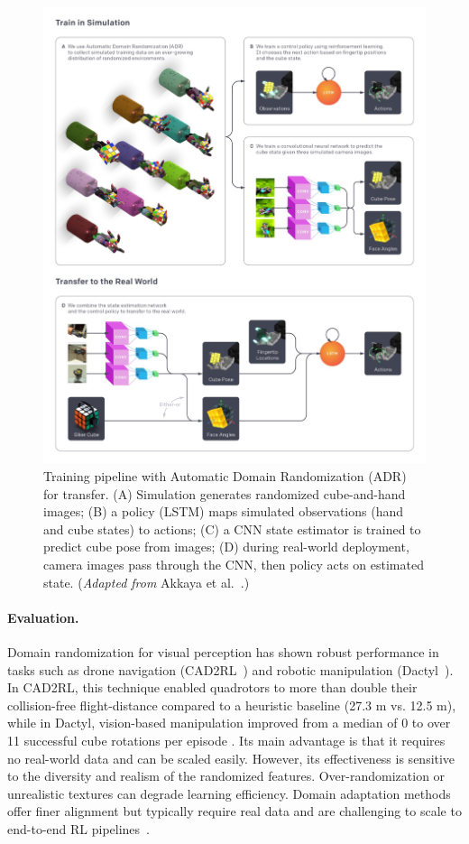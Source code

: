 \begin{figure}[H]
    \centering
    \includegraphics[width=0.95\linewidth]{figures/figAdrPipeline.png}
    \caption{Training pipeline with Automatic Domain Randomization (ADR) for \simtoreal transfer. (A) Simulation generates randomized cube-and-hand images; (B) a policy (LSTM) maps simulated observations (hand and cube states) to actions; (C) a CNN state estimator is trained to predict cube pose from images; (D) during real-world deployment, camera images pass through the CNN, then policy acts on estimated state. (\emph{Adapted from} Akkaya et al.~\cite{Akkaya2019}.)}
    \label{fig:adr_pipeline}
\end{figure}

\paragraph{Evaluation.} Domain randomization for visual perception has shown robust performance in tasks such as drone navigation (CAD2RL~\cite{Sadeghi2017}) and robotic manipulation (Dactyl~\cite{Akkaya2019}). In CAD2RL, this technique enabled quadrotors to more than double their collision-free flight-distance compared to a heuristic baseline (27.3 m vs. 12.5 m), while in Dactyl, vision-based manipulation improved from a median of 0 to over 11 successful cube rotations per episode \cite{Akkaya2019,Sadeghi2017}. Its main advantage is that it requires no real-world data and can be scaled easily. However, its effectiveness is sensitive to the diversity and realism of the randomized features. Over-randomization or unrealistic textures can degrade learning efficiency. Domain adaptation methods offer finer alignment but typically require real data and are challenging to scale to end-to-end RL pipelines~\cite{Tzeng2017}.

